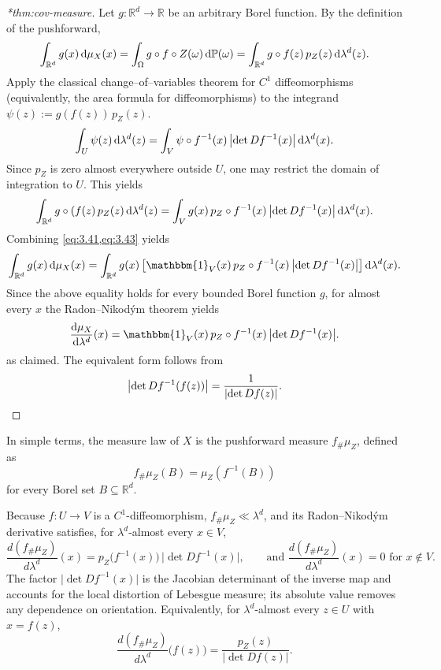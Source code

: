\begin{proof}[*thm:cov-measure]
    Let \(g: \mathbb{R}^d\to\mathbb{R}\) be an arbitrary Borel function.
    By the definition of the pushforward,
    \[
    \label{eq:3.41}
        \int_{\mathbb{R}^d} g(x)\, \dd\mu_X(x) = \int_{\Omega} g\circ f\circ Z(\omega)\,\dd\mathbb{P}(\omega) =
        \int_{\mathbb{R}^d} g\circ f(z)\, p_Z(z)\, \dd\lambda^d(z).
    \]
    Apply the classical change--of--variables theorem for \(C^1\) diffeomorphisms (equivalently, the area formula for diffeomorphisms) to the integrand \(\psi(z):=g(f(z))\,p_Z(z)\).
    \[
        \int_{U} \psi(z)\, \dd\lambda^d(z) = \int_{V} \psi\circ f^{-1}(x)\, \qty|\det D f^{-1}(x)|\, \dd\lambda^d(x).
    \]
    Since \(p_Z\) is zero almost everywhere outside \(U\), one may restrict the domain of integration to \(U\).
    This yields
    \[
    \label{eq:3.43}
        \int_{\mathbb{R}^d} g\circ(f(z)\, p_Z(z)\, \dd\lambda^d(z) = \int_{V} g(x)\, p_Z\circ f^{-1}(x)\, \qty|\det D f^{-1}(x)|\, \dd\lambda^d(x).
    \]
    Combining \cref{eq:3.41,eq:3.43} yields
    \[
        \int_{\R^d} g(x)\, \dd\mu_X(x) = \int_{\R^d} g(x)\, 
        \qty[ \mathbbm{1}_V(x)\, p_Z\circ f^{-1}(x)\, \qty|\det D f^{-1}(x)| ]\, \dd\lambda^d(x).
    \]
    Since the above equality holds for every bounded Borel function \(g\), for almost every \(x\) the Radon--Nikod\'ym theorem yields
    \[
        \frac{\dd\mu_X}{\dd\lambda^d}(x)=\mathbbm{1}_V(x)\, p_Z\circ f\inv(x)\, \qty|\det D f\inv(x)|.
    \]
as claimed. The equivalent form follows from
\[\qty|\det D f^{-1}(f(z))|=\frac1{\qty|\det D f(z)|}.
\]
\end{proof}

    In simple terms, the measure law of $X$ is the pushforward measure $f_{\#}\mu_Z$, defined as
\[
    f_{\#}\mu_Z(B)=\mu_Z\!\left(f^{-1}(B)\right)
\]
for every Borel set $B\subseteq\mathbb{R}^d$.

Because $f:U\to V$ is a $C^1$-diffeomorphism, $f_{\#}\mu_Z\ll\lambda^d$, and its
Radon--Nikod\'ym derivative satisfies, for $\lambda^d$-almost every $x\in V$,
\[
\frac{d(f_{\#}\mu_Z)}{d\lambda^d}(x)
= p_Z\!\bigl(f^{-1}(x)\bigr)\, \bigl|\det Df^{-1}(x)\bigr|,
\qquad \text{and } \frac{d(f_{\#}\mu_Z)}{d\lambda^d}(x)=0 \text{ for } x\notin V.
\]
The factor $\lvert\det Df^{-1}(x)\rvert$ is the Jacobian determinant of the inverse
map and accounts for the local distortion of Lebesgue measure; its absolute value
removes any dependence on orientation. Equivalently, for $\lambda^d$-almost every
$z\in U$ with $x=f(z)$,
\[
\frac{d(f_{\#}\mu_Z)}{d\lambda^d}\bigl(f(z)\bigr)
=\frac{p_Z(z)}{\lvert\det Df(z)\rvert}.
\]

